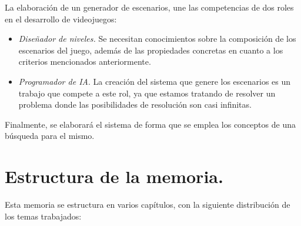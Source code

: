 La elaboración de un generador de escenarios, une las competencias de dos roles en el desarrollo de videojuegos:

\begin{itemize}
	\item \emph{Diseñador de niveles.} Se necesitan conocimientos sobre la composición de los escenarios del juego, además de las propiedades concretas en cuanto a los criterios mencionados anteriormente.
	\item \emph{Programador de IA}. La creación del sistema que genere los escenarios es un trabajo que compete a este rol, ya que estamos tratando de resolver un problema donde las posibilidades de resolución son casi infinitas.
\end{itemize}

Finalmente, se elaborará el sistema de forma que se emplea los conceptos de una búsqueda para el mismo.

\section*{Estructura de la memoria.}

Esta memoria se estructura en varios capítulos, con la siguiente distribución de los temas trabajados:

